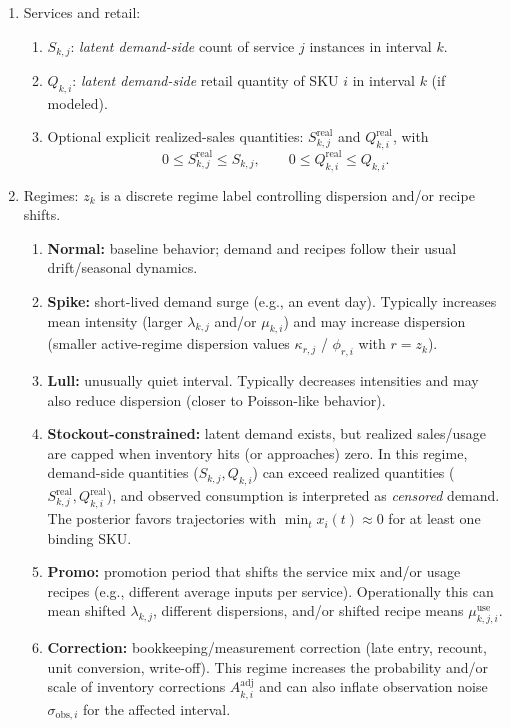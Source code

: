 \documentclass[11pt]{article}
\begin{document}
\begin{enumerate}
  \item Services and retail:
  \begin{enumerate}
    \item $S_{k,j}$: \emph{latent demand-side} count of service $j$ instances in interval $k$.
    \item $Q_{k,i}$: \emph{latent demand-side} retail quantity of SKU $i$ in interval $k$ (if modeled).
    \item Optional explicit realized-sales quantities: $S^{\mathrm{real}}_{k,j}$ and $Q^{\mathrm{real}}_{k,i}$, with
    \[
      0\le S^{\mathrm{real}}_{k,j}\le S_{k,j},\qquad 0\le Q^{\mathrm{real}}_{k,i}\le Q_{k,i}.
    \]
  \end{enumerate}
  \item Regimes: $z_k$ is a discrete regime label controlling dispersion and/or recipe shifts.
  \begin{enumerate}
    \item \textbf{Normal:} baseline behavior; demand and recipes follow their usual drift/seasonal dynamics.

    \item \textbf{Spike:} short-lived demand surge (e.g., an event day). Typically increases mean intensity (larger $\lambda_{k,j}$ and/or $\mu_{k,i}$) and may increase dispersion (smaller active-regime dispersion values $\kappa_{r,j}$ / $\phi_{r,i}$ with $r=z_k$).

    \item \textbf{Lull:} unusually quiet interval. Typically decreases intensities and may also reduce dispersion (closer to Poisson-like behavior).

    \item \textbf{Stockout-constrained:} latent demand exists, but realized sales/usage are capped when inventory hits (or approaches) zero. In this regime, demand-side quantities ($S_{k,j},Q_{k,i}$) can exceed realized quantities ($S^{\mathrm{real}}_{k,j},Q^{\mathrm{real}}_{k,i}$), and observed consumption is interpreted as \emph{censored} demand. The posterior favors trajectories with $\min_t x_i(t) \approx 0$ for at least one binding SKU.

    \item \textbf{Promo:} promotion period that shifts the service mix and/or usage recipes (e.g., different average inputs per service). Operationally this can mean shifted $\lambda_{k,j}$, different dispersions, and/or shifted recipe means $\mu^{\mathrm{use}}_{k,j,i}$.

    \item \textbf{Correction:} bookkeeping/measurement correction (late entry, recount, unit conversion, write-off). This regime increases the probability and/or scale of inventory corrections $A^{\mathrm{adj}}_{k,i}$ and can also inflate observation noise $\sigma_{\text{obs},i}$ for the affected interval.
  \end{enumerate}


\end{enumerate}
\end{document}

